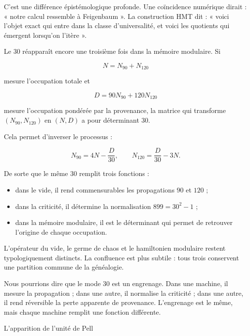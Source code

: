 C’est une différence épistémologique profonde. Une coïncidence numérique dirait : « notre calcul ressemble à Feigenbaum ». La construction HMT dit : « voici l’objet exact qui entre dans la classe d’universalité, et voici les quotients qui émergent lorsqu’on l’itère ».\par

Le \(30\) réapparaît encore une troisième fois dans la mémoire modulaire. Si\par

\[
N=N_{90}+N_{120}
\]

mesure l’occupation totale et\par

\[
D=90N_{90}+120N_{120}
\]

mesure l’occupation pondérée par la provenance, la matrice qui transforme \((N_{90},N_{120})\) en \((N,D)\) a pour déterminant \(30\).\par

Cela permet d’inverser le processus :\par

\[
N_{90}=4N-\frac D{30},
\qquad
N_{120}=\frac D{30}-3N.
\]

De sorte que le même \(30\) remplit trois fonctions :\par

\begin{itemize}[leftmargin=*,itemsep=0.35em]
\item dans le vide, il rend commensurables les propagations \(90\) et \(120\) ;
\item dans la criticité, il détermine la normalisation \(899=30^2-1\) ;
\item dans la mémoire modulaire, il est le déterminant qui permet de retrouver l’origine de chaque occupation.
\end{itemize}

L’opérateur du vide, le germe de chaos et le hamiltonien modulaire restent typologiquement distincts. La confluence est plus subtile : tous trois conservent une partition commune de la généalogie.\par

Nous pourrions dire que le mode \(30\) est un engrenage. Dans une machine, il mesure la propagation ; dans une autre, il normalise la criticité ; dans une autre, il rend réversible la perte apparente de provenance. L’engrenage est le même, mais chaque machine remplit une fonction différente.\par

L’apparition de l’unité de Pell\par

